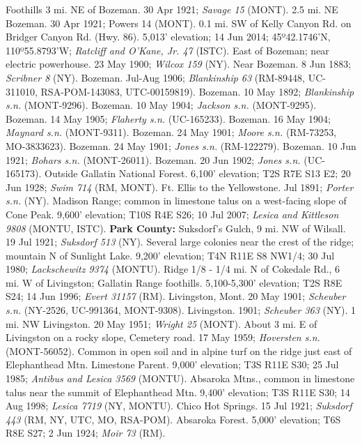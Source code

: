 Foothills 3 mi. NE of Bozeman. 30 Apr 1921; \textit{Savage 15} (MONT).
2.5 mi. NE Bozeman. 30 Apr 1921; Powers 14 (MONT).
0.1 mi. SW of Kelly Canyon Rd. on Bridger Canyon Rd. (Hwy. 86). 5,013'
elevation; 14 Jun 2014; 45º42.1746'N, 110º55.8793'W;
\textit{Ratcliff and O'Kane, Jr. 47} (ISTC).
East of Bozeman; near electric powerhouse. 23 May 1900;
\textit{Wilcox 159} (NY).
Near Bozeman. 8 Jun 1883; \textit{Scribner 8} (NY).
Bozeman. Jul-Aug 1906; \textit{Blankinship 63}
(RM-89448, UC-311010, RSA-POM-143083, UTC-00159819).
Bozeman. 10 May 1892; \textit{Blankinship s.n.} (MONT-9296).
Bozeman. 10 May 1904; \textit{Jackson s.n.} (MONT-9295).
Bozeman. 14 May 1905; \textit{Flaherty s.n.} (UC-165233).
Bozeman. 16 May 1904; \textit{Maynard s.n.} (MONT-9311).
Bozeman. 24 May 1901; \textit{Moore s.n.} (RM-73253, MO-3833623).
Bozeman. 24 May 1901; \textit{Jones s.n.} (RM-122279).
Bozeman. 10 Jun 1921; \textit{Bohars s.n.} (MONT-26011).
Bozeman. 20 Jun 1902; \textit{Jones s.n.} (UC-165173).
Outside Gallatin National Forest. 6,100’ elevation; T2S R7E S13 E2;
20 Jun 1928; \textit{Swim 714} (RM, MONT).
Ft. Ellis to the Yellowstone. Jul 1891; \textit{Porter s.n.} (NY).
Madison Range; common in limestone talus on a west-facing slope of Cone Peak.
9,600’ elevation; T10S R4E S26; 10 Jul 2007;
\textit{Lesica and Kittleson 9808} (MONTU, ISTC).
  \textbf{Park County:}
Suksdorf's Gulch, 9 mi. NW of Wilsall. 19 Jul 1921; \textit{Suksdorf 513} (NY).
Several large colonies near the crest of the ridge; mountain N of Sunlight Lake.
9,200' elevation; T4N R11E S8 NW1/4; 30 Jul 1980;
\textit{Lackschewitz 9374} (MONTU).
Ridge 1/8 - 1/4 mi. N of Cokedale Rd., 6 mi. W of Livingston; Gallatin Range
foothills. 5,100-5,300’ elevation; T2S R8E S24; 14 Jun 1996;
\textit{Evert 31157} (RM).
Livingston, Mont. 20 May 1901; \textit{Scheuber s.n.}
(NY-2526, UC-991364, MONT-9308).
Livingston. 1901; \textit{Scheuber 363} (NY).
1 mi. NW Livingston. 20 May 1951; \textit{Wright 25} (MONT).
About 3 mi. E of Livingston on a rocky slope, Cemetery road. 17 May 1959;
\textit{Hoversten s.n.} (MONT-56052).
Common in open soil and in alpine turf on the ridge just east of Elephanthead
Mtn. Limestone Parent. 9,000' elevation; T3S R11E S30; 25 Jul 1985;
\textit{Antibus and Lesica 3569} (MONTU).
Absaroka Mtns., common in limestone talus near the summit of Elephanthead Mtn.
9,400’ elevation; T3S R11E S30; 14 Aug 1998; \textit{Lesica 7719} (NY, MONTU).
Chico Hot Springs. 15 Jul 1921;
\textit{Suksdorf 443} (RM, NY, UTC, MO, RSA-POM).
Absaroka Forest. 5,000’ elevation; T6S R8E S27; 2 Jun 1924;
\textit{Moir 73} (RM).
